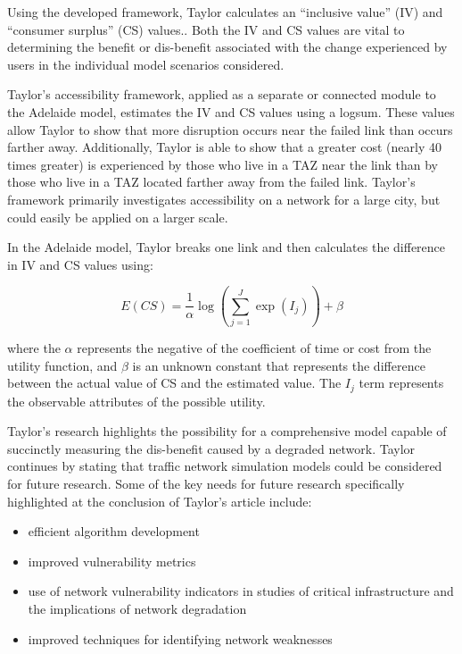 Using the developed framework, Taylor calculates an ``inclusive value'' (IV)
and ``consumer surplus'' (CS) values.. Both the IV and CS values are vital to
determining the benefit or dis-benefit
associated with the change experienced by users in the individual model
scenarios considered.

Taylor's accessibility framework, applied as a separate or connected module to
the Adelaide model, estimates the IV and CS values using a logsum.
These values allow Taylor to show that more disruption occurs near the
failed link than occurs farther away. Additionally, Taylor is able to show
that a greater cost (nearly 40 times greater) is experienced by those who
live in a TAZ near the link than by those who live in a TAZ located
farther away from the failed link. Taylor's framework primarily
investigates accessibility on a network for a large city,
but could easily be applied on a larger scale.

In the Adelaide model, Taylor breaks one link and
then calculates the difference in IV and CS values using:

	\begin{equation}
		E(CS) = \frac{1}{\alpha} \log (\sum_{j = 1}^{J} \exp (I_j)) + \beta
			\label{eqn:taylor}
	\end{equation}

\noindent where the \(\alpha\) represents the negative of the coefficient of time or cost from the utility function,
and \(\beta\) is an unknown constant that represents the difference between the actual value of CS and the estimated value.
The \(I_j\) term represents the observable attributes of the possible utility. 

Taylor's research highlights the possibility for a comprehensive model capable
of succinctly measuring the dis-benefit caused by a degraded network.
Taylor continues by stating that traffic network simulation models
could be considered for future research. Some of the key needs for
future research specifically highlighted at the conclusion of Taylor's article include:

	\begin{itemize}
		\item efficient algorithm development
		\item improved vulnerability metrics
		\item use of network vulnerability indicators in studies of critical
		infrastructure and the implications of network degradation
		\item improved techniques for identifying network weaknesses
	\end{itemize}

